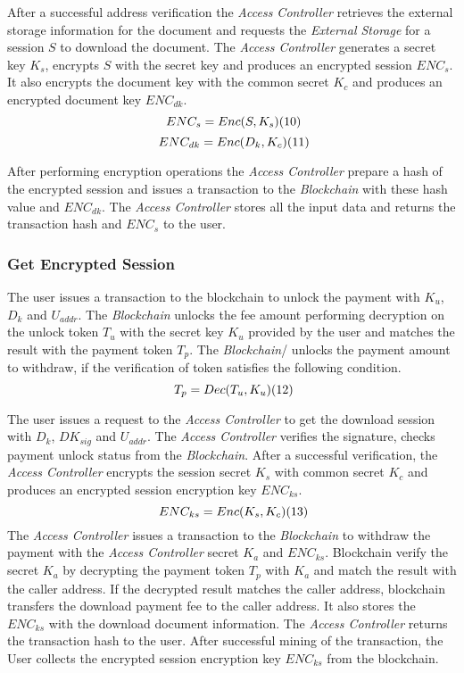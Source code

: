 \documentclass[conference]{IEEEtran}
\begin{document}
After a successful address verification the {\it Access Controller} retrieves the external storage information for the document and requests the {\it External Storage} for a session $S$ to download the document. The {\it Access Controller} generates a secret key $K_s$,  encrypts $S$ with the secret key and produces an encrypted session $ENC_s$. It also encrypts the document key with the common secret $K_c$ and produces an encrypted document key $ENC_{dk}$. 
$$
{\ ENC_s = Enc (S, K_s)}  \relax{(10)}
$$
$$
{\ ENC_{dk} = Enc (D_k, K_c)}  \relax{(11)}
$$

After performing encryption operations the {\it Access Controller} prepare a hash of the encrypted session and issues a transaction to the {\it Blockchain} with these hash value and $ENC_{dk}$. The {\it Access Controller} stores all the input data and returns the transaction hash and $ENC_s$ to the user.

\subsubsection{Get Encrypted Session}
The user issues a transaction to the blockchain to unlock the payment with $K_u$, $D_k$ and $U_{addr}$. The {\it Blockchain} unlocks the fee amount performing decryption on the unlock token $T_u$ with the secret key $K_u$ provided by the user and matches the result with the payment token $T_p$. The {\it Blockchain}/ unlocks the payment amount to withdraw, if the verification of token satisfies the following condition.
$$
{\ T_p = Dec (T_u, K_u)}  \relax{(12)}
$$

The user issues a request to the {\it Access Controller} to get the download session with $D_k$, $DK_{sig}$ and $U_{addr}$. The {\it Access Controller} verifies the signature, checks payment unlock status from the  {\it Blockchain}. After a successful verification, the {\it Access Controller} encrypts the session secret $K_s$ with common secret $K_c$ and produces an encrypted session encryption key $ENC_{ks}$.
$$
{\ ENC_{ks} = Enc (K_s, K_c)}  \relax{(13)}
$$
The {\it Access Controller} issues a transaction to the {\it Blockchain} to withdraw the payment with the {\it Access Controller} secret $K_a$ and $ENC_{ks}$. Blockchain verify the secret $K_a$ by decrypting the payment token $T_p$ with $K_a$ and match the result with the caller address. If the decrypted result matches the caller address, blockchain transfers the download payment fee to the caller address. It also stores the $ENC_{ks}$ with the download document information. The {\it Access Controller} returns the transaction hash to the user. After successful mining of the transaction, the User collects the encrypted session encryption key $ENC_{ks}$ from the blockchain.
\end{document}
